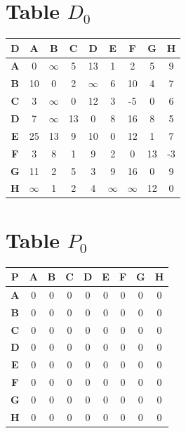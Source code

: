 \documentclass{article}
\begin{document}
\section{Table $D_{0}$}
\begin{center}
    \begin{tabular}{|c||c|c|c|c|c|c|c|c|}
        \hline
        \textbf{D} & \textbf{A} & \textbf{B} & \textbf{C} & \textbf{D} & \textbf{E} & \textbf{F} & \textbf{G} & \textbf{H} \\
        \hline
        \hline
        \textbf{A}& 0 & $\infty$ & 5 & 13 & 1 & 2 & 5 & 9 \\
        \hline
        \textbf{B}& 10 & 0 & 2 & $\infty$ & 6 & 10 & 4 & 7 \\
        \hline
        \textbf{C}& 3 & $\infty$ & 0 & 12 & 3 & -5 & 0 & 6 \\
        \hline
        \textbf{D}& 7 & $\infty$ & 13 & 0 & 8 & 16 & 8 & 5 \\
        \hline
        \textbf{E}& 25 & 13 & 9 & 10 & 0 & 12 & 1 & 7 \\
        \hline
        \textbf{F}& 3 & 8 & 1 & 9 & 2 & 0 & 13 & -3 \\
        \hline
        \textbf{G}& 11 & 2 & 5 & 3 & 9 & 16 & 0 & 9 \\
        \hline
        \textbf{H}& $\infty$ & 1 & 2 & 4 & $\infty$ & $\infty$ & 12 & 0 \\
        \hline
    \end{tabular}
\end{center}


\section{Table $P_{0}$}
\begin{center}
    \begin{tabular}{|c||c|c|c|c|c|c|c|c|}
        \hline
        \textbf{P} & \textbf{A} & \textbf{B} & \textbf{C} & \textbf{D} & \textbf{E} & \textbf{F} & \textbf{G} & \textbf{H} \\
        \hline
        \hline
        \textbf{A}& 0 & 0 & 0 & 0 & 0 & 0 & 0 & 0 \\
        \hline
        \textbf{B}& 0 & 0 & 0 & 0 & 0 & 0 & 0 & 0 \\
        \hline
        \textbf{C}& 0 & 0 & 0 & 0 & 0 & 0 & 0 & 0 \\
        \hline
        \textbf{D}& 0 & 0 & 0 & 0 & 0 & 0 & 0 & 0 \\
        \hline
        \textbf{E}& 0 & 0 & 0 & 0 & 0 & 0 & 0 & 0 \\
        \hline
        \textbf{F}& 0 & 0 & 0 & 0 & 0 & 0 & 0 & 0 \\
        \hline
        \textbf{G}& 0 & 0 & 0 & 0 & 0 & 0 & 0 & 0 \\
        \hline
        \textbf{H}& 0 & 0 & 0 & 0 & 0 & 0 & 0 & 0 \\
        \hline
    \end{tabular}
\end{center}
\end{document}
